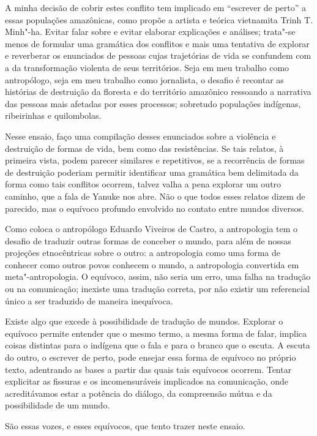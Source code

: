 A minha decisão de cobrir estes conflito tem implicado em ``escrever de
perto'' a essas populações amazônicas, como propõe a artista e teórica
vietnamita Trinh T. Minh"-ha. Evitar falar sobre e evitar elaborar
explicações e análises; trata"-se menos de formular uma gramática dos
conflitos e mais uma tentativa de explorar e reverberar os enunciados de
pessoas cujas trajetórias de vida se confundem com a da transformação
violenta de seus territórios. Seja em meu trabalho como antropólogo,
seja em meu trabalho como jornalista, o desafio é recontar as histórias
de destruição da floresta e do território amazônico ressoando a
narrativa das pessoas mais afetadas por esses processos; sobretudo
populações indígenas, ribeirinhas e quilombolas.

Nesse ensaio, faço uma compilação desses enunciados sobre a violência e
destruição de formas de vida, bem como das resistências. Se tais relatos, à primeira vista,
podem parecer similares e repetitivos, se a recorrência de formas de
destruição poderiam permitir identificar uma gramática bem delimitada da
forma como tais conflitos ocorrem, talvez valha a pena explorar um outro
caminho, que a fala de Yanuke nos abre. Não o que todos esses relatos
dizem de parecido, mas o equívoco profundo envolvido no contato entre
mundos diversos.

Como coloca o antropólogo Eduardo Viveiros de Castro, a antropologia tem
o desafio de traduzir outras formas de conceber o mundo, para além de
nossas projeções etnocêntricas sobre o outro: a antropologia como uma
forma de conhecer como outros povos conhecem o mundo, a antropologia
convertida em meta"-antropologia. O equívoco, assim, não seria um erro,
uma falha na tradução ou na comunicação; inexiste uma tradução correta,
por não existir um referencial único a ser traduzido de maneira
inequívoca.

Existe algo que excede à possibilidade de tradução de mundos. Explorar o
equívoco permite entender que o mesmo termo, a mesma forma de falar,
implica coisas distintas para o indígena que o fala e para o branco que
o escuta. A escuta do outro, o escrever de perto, pode ensejar essa
forma de equívoco no próprio texto, adentrando as bases a partir das
quais tais equívocos ocorrem. Tentar explicitar as fissuras e os
incomensuráveis implicados na comunicação, onde acreditávamos estar a
potência do diálogo, da compreensão mútua e da possibilidade de um
mundo.

São essas vozes, e esses equívocos, que tento trazer neste ensaio.


